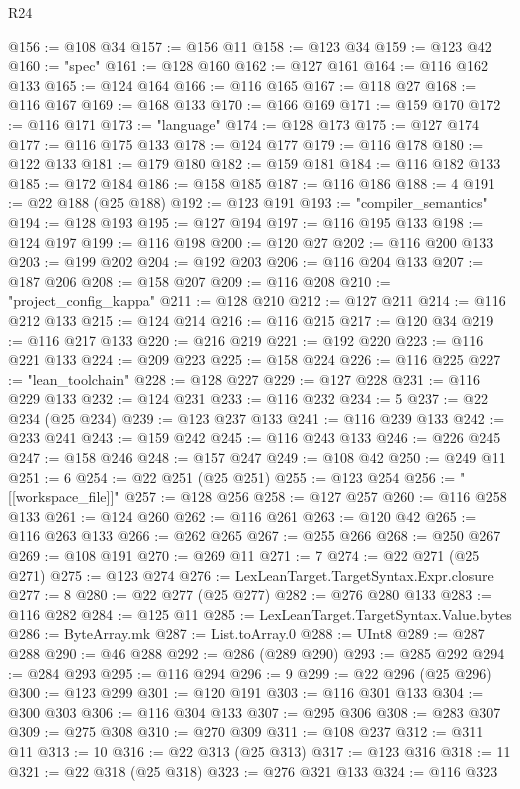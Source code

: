 \begin{lexlean}{R24}
\begin{coremodule}
@156 := @108 @34
@157 := @156 @11
@158 := @123 @34
@159 := @123 @42
@160 := "spec"
@161 := @128 @160
@162 := @127 @161
@164 := @116 @162 @133
@165 := @124 @164
@166 := @116 @165
@167 := @118 @27
@168 := @116 @167
@169 := @168 @133
@170 := @166 @169
@171 := @159 @170
@172 := @116 @171
@173 := "language"
@174 := @128 @173
@175 := @127 @174
@177 := @116 @175 @133
@178 := @124 @177
@179 := @116 @178
@180 := @122 @133
@181 := @179 @180
@182 := @159 @181
@184 := @116 @182 @133
@185 := @172 @184
@186 := @158 @185
@187 := @116 @186
@188 := 4
@191 := @22 @188 (@25 @188)
@192 := @123 @191
@193 := "compiler_semantics"
@194 := @128 @193
@195 := @127 @194
@197 := @116 @195 @133
@198 := @124 @197
@199 := @116 @198
@200 := @120 @27
@202 := @116 @200 @133
@203 := @199 @202
@204 := @192 @203
@206 := @116 @204 @133
@207 := @187 @206
@208 := @158 @207
@209 := @116 @208
@210 := "project_config_kappa"
@211 := @128 @210
@212 := @127 @211
@214 := @116 @212 @133
@215 := @124 @214
@216 := @116 @215
@217 := @120 @34
@219 := @116 @217 @133
@220 := @216 @219
@221 := @192 @220
@223 := @116 @221 @133
@224 := @209 @223
@225 := @158 @224
@226 := @116 @225
@227 := "lean_toolchain"
@228 := @128 @227
@229 := @127 @228
@231 := @116 @229 @133
@232 := @124 @231
@233 := @116 @232
@234 := 5
@237 := @22 @234 (@25 @234)
@239 := @123 @237 @133
@241 := @116 @239 @133
@242 := @233 @241
@243 := @159 @242
@245 := @116 @243 @133
@246 := @226 @245
@247 := @158 @246
@248 := @157 @247
@249 := @108 @42
@250 := @249 @11
@251 := 6
@254 := @22 @251 (@25 @251)
@255 := @123 @254
@256 := "[[workspace_file]]"
@257 := @128 @256
@258 := @127 @257
@260 := @116 @258 @133
@261 := @124 @260
@262 := @116 @261
@263 := @120 @42
@265 := @116 @263 @133
@266 := @262 @265
@267 := @255 @266
@268 := @250 @267
@269 := @108 @191
@270 := @269 @11
@271 := 7
@274 := @22 @271 (@25 @271)
@275 := @123 @274
@276 := LexLeanTarget.TargetSyntax.Expr.closure
@277 := 8
@280 := @22 @277 (@25 @277)
@282 := @276 @280 @133
@283 := @116 @282
@284 := @125 @11
@285 := LexLeanTarget.TargetSyntax.Value.bytes
@286 := ByteArray.mk
@287 := List.toArray.{0}
@288 := UInt8
@289 := @287 @288
@290 := @46 @288
@292 := @286 (@289 @290)
@293 := @285 @292
@294 := @284 @293
@295 := @116 @294
@296 := 9
@299 := @22 @296 (@25 @296)
@300 := @123 @299
@301 := @120 @191
@303 := @116 @301 @133
@304 := @300 @303
@306 := @116 @304 @133
@307 := @295 @306
@308 := @283 @307
@309 := @275 @308
@310 := @270 @309
@311 := @108 @237
@312 := @311 @11
@313 := 10
@316 := @22 @313 (@25 @313)
@317 := @123 @316
@318 := 11
@321 := @22 @318 (@25 @318)
@323 := @276 @321 @133
@324 := @116 @323

\end{coremodule}
\end{lexlean}
